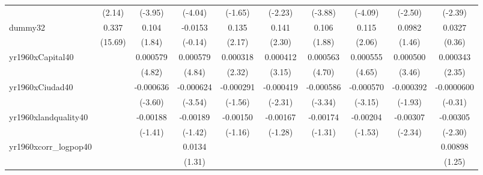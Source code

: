 {\begin{tabular}{l*{9}{c}}
            &      (2.14)         &     (-3.95)         &     (-4.04)         &     (-1.65)         &     (-2.23)         &     (-3.88)         &     (-4.09)         &     (-2.50)         &     (-2.39)         \\
[1em]
dummy32     &       0.337\sym{***}&       0.104         &     -0.0153         &       0.135\sym{*}  &       0.141\sym{*}  &       0.106         &       0.115\sym{*}  &      0.0982         &      0.0327         \\
            &     (15.69)         &      (1.84)         &     (-0.14)         &      (2.17)         &      (2.30)         &      (1.88)         &      (2.06)         &      (1.46)         &      (0.36)         \\
[1em]
yr1960xCapital40&                     &    0.000579\sym{***}&    0.000579\sym{***}&    0.000318\sym{*}  &    0.000412\sym{**} &    0.000563\sym{***}&    0.000555\sym{***}&    0.000500\sym{***}&    0.000343\sym{*}  \\
            &                     &      (4.82)         &      (4.84)         &      (2.32)         &      (3.15)         &      (4.70)         &      (4.65)         &      (3.46)         &      (2.35)         \\
[1em]
yr1960xCiudad40&                     &   -0.000636\sym{***}&   -0.000624\sym{***}&   -0.000291         &   -0.000419\sym{*}  &   -0.000586\sym{***}&   -0.000570\sym{**} &   -0.000392         &  -0.0000600         \\
            &                     &     (-3.60)         &     (-3.54)         &     (-1.56)         &     (-2.31)         &     (-3.34)         &     (-3.15)         &     (-1.93)         &     (-0.31)         \\
[1em]
yr1960xlandquality40&                     &    -0.00188         &    -0.00189         &    -0.00150         &    -0.00167         &    -0.00174         &    -0.00204         &    -0.00307\sym{*}  &    -0.00305\sym{*}  \\
            &                     &     (-1.41)         &     (-1.42)         &     (-1.16)         &     (-1.28)         &     (-1.31)         &     (-1.53)         &     (-2.34)         &     (-2.30)         \\
[1em]
yr1960xcorr\_logpop40&                     &                     &      0.0134         &                     &                     &                     &                     &                     &     0.00898         \\
            &                     &                     &      (1.31)         &                     &                     &                     &                     &                     &      (1.25)         \\

\end{tabular}}
